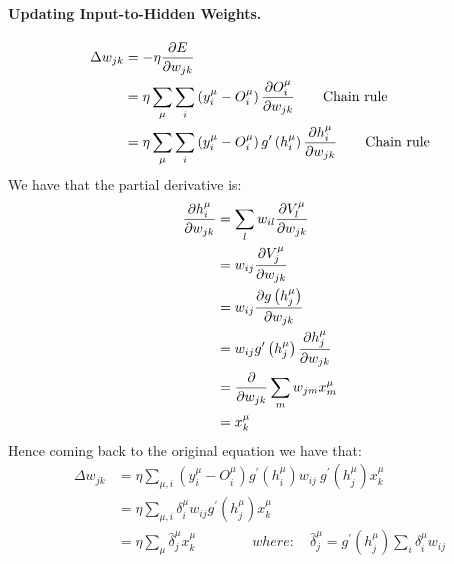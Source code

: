 \paragraph*{Updating Input-to-Hidden Weights.}
\begin{equation} \notag
\begin{split}
\Delta w _ { j k } &= - \eta \frac { \partial E } { \partial w _ { j k } } \\
&= \eta \sum _ { \mu } \sum _ { i } \left( y _ { i } ^ { \mu } - O _ { i } ^ { \mu } \right) \frac { \partial O _ { i } ^ { \mu } } { \partial w _ { j k } } \qquad \text{Chain rule}\\
&= \eta \sum _ { \mu } \sum _ { i } \left( y _ { i } ^ { \mu } - O _ { i } ^ { \mu } \right) g ^ { \prime } \left( h _ { i } ^ { \mu } \right) \frac { \partial h _ { i } ^ { \mu } } { \partial w _ { j k } } \qquad \text{Chain rule}
\end{split}
\end{equation}
We have that the partial derivative is:
\begin{equation} \notag
\begin{split}
\frac { \partial h _ { i } ^ { \mu } } { \partial w _ { j k } } &= \sum _ { l } w_{ i l } \frac { \partial V _ { l } ^ { \mu } } { \partial w_{ j k } }\\
&= w_ { i j } \frac { \partial  V_ { j } ^ { \mu } } { \partial  w _ { j k } }\\
&= w_{ i j } \frac { \partial g \left( h _ { j } ^ { \mu } \right) } { \partial w _ { j k } }\\
&= w_{ i j } g ^ { \prime } \left( h _ { j } ^ { \mu } \right) \frac { \partial h _ { j } ^ { \mu } } { \partial w _ { j k } }\\
&=\frac { \partial } { \partial w _ { j k } } \sum _ { m } w _ { j m } x _ { m } ^ { \mu }\\
&= x _ { k } ^ { \mu }
\end{split}
\end{equation}
Hence coming back to the original equation we have that:
\begin{equation}
\begin{split}
\Delta w _ { j k } &= \eta \sum _ { \mu , i } \left( y _ { i } ^ { \mu } - O _ { i } ^ { \mu } \right) g ^ { \prime } \left( h _ { i } ^ { \mu } \right) w_ { i j } ~g ^ { \prime } \left( h _ { j } ^ { \mu } \right) x _ { k } ^ { \mu }\\
&= \eta \sum _ { \mu , i } \delta _ { i } ^ { \mu } w_ { i j } g ^ { \prime } \left( h _ { j } ^ { \mu } \right) x _ { k } ^ { \mu }\\
&= \eta \sum _ { \mu } \hat { \delta } _ { j } ^ { \mu } x _ { k } ^ { \mu } \qquad \qquad where: \quad \hat { \delta } _ { j } ^ { \mu } = g ^ { \prime } \left( h _ { j } ^ { \mu } \right) \sum _ { i } \delta _ { i } ^ { \mu } w_ { i j }
\end{split}
\end{equation}
